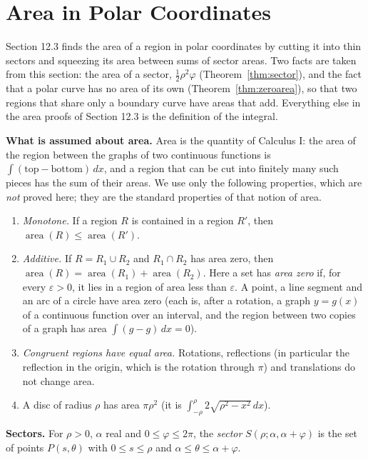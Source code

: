 \documentclass[11pt]{article}
\begin{document}
\section{Area in Polar Coordinates}

Section 12.3 finds the area of a region in polar coordinates by cutting it into thin sectors and squeezing its area between sums of sector areas. Two facts are taken from this section: the area of a sector, $\frac12\rho^2\varphi$ (Theorem~\ref{thm:sector}), and the fact that a polar curve has no area of its own (Theorem~\ref{thm:zeroarea}), so that two regions that share only a boundary curve have areas that add. Everything else in the area proofs of Section 12.3 is the definition of the integral.

\textbf{What is assumed about area.} Area is the quantity of Calculus I: the area of the region between the graphs of two continuous functions is $\int(\text{top}-\text{bottom})\,dx$, and a region that can be cut into finitely many such pieces has the sum of their areas. We use only the following properties, which are \emph{not} proved here; they are the standard properties of that notion of area.
\begin{enumerate}[nosep]
  \item[(A1)] \emph{Monotone.} If a region $R$ is contained in a region $R'$, then $\operatorname{area}(R)\le\operatorname{area}(R')$.
  \item[(A2)] \emph{Additive.} If $R=R_1\cup R_2$ and $R_1\cap R_2$ has area zero, then $\operatorname{area}(R)=\operatorname{area}(R_1)+\operatorname{area}(R_2)$. Here a set has \emph{area zero} if, for every $\varepsilon>0$, it lies in a region of area less than $\varepsilon$. A point, a line segment and an arc of a circle have area zero (each is, after a rotation, a graph $y=g(x)$ of a continuous function over an interval, and the region between two copies of a graph has area $\int(g-g)\,dx=0$).
  \item[(A3)] \emph{Congruent regions have equal area.} Rotations, reflections (in particular the reflection in the origin, which is the rotation through $\pi$) and translations do not change area.
  \item[(A4)] A disc of radius $\rho$ has area $\pi\rho^2$ (it is $\int_{-\rho}^{\rho}2\sqrt{\rho^2-x^2}\,dx$).
\end{enumerate}

\textbf{Sectors.} For $\rho>0$, $\alpha$ real and $0\le\varphi\le2\pi$, the \emph{sector} $S(\rho;\alpha,\alpha+\varphi)$ is the set of points $P(s,\theta)$ with $0\le s\le\rho$ and $\alpha\le\theta\le\alpha+\varphi$.
\end{document}
